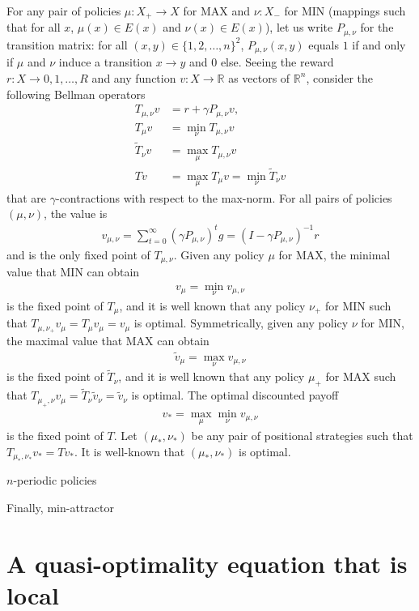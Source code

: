 \documentclass{article}
\def\R{\mathds R}
\begin{document}
For any pair of policies $\mu:X_+ \to X$ for MAX and $\nu:X_-$ for MIN (mappings such that for all $x$, $\mu(x) \in E(x)$ and $\nu(x) \in E(x)$), let us write $P_{\mu,\nu}$ for the transition matrix: for all $(x,y) \in \{1,2,\dots,n\}^2$, $P_{\mu,\nu}(x,y)$ equals $1$ if and only if $\mu$ and $\nu$ induce a transition $x \to y$ and $0$ else. 
Seeing the reward $r:X \to {0,1,\dots,R}$ and any function $v:X \to \R$ as vectors of $\R^n$, consider the following Bellman operators
\begin{align}
  T_{\mu,\nu}v & = r + \gamma P_{\mu,\nu}v, \\
  T_{\mu}v & = \min_{\nu} T_{\mu,\nu}v \\
  \tilde T_{\nu}v & = \max_\mu T_{\mu,\nu}v \\
  T v & =\max_\mu T_{\mu }v = \min_\nu \tilde T_{\nu}v
\end{align}
that are $\gamma$-contractions with respect to the max-norm.
For all pairs of policies $(\mu,\nu)$, the value is
\begin{align}
v_{\mu,\nu} = \sum_{t=0}^\infty (\gamma P_{\mu,\nu})^t g = (I-\gamma P_{\mu,\nu})^{-1}r
\end{align}
and is the only fixed point of $T_{\mu,\nu}$.
Given any policy $\mu$ for MAX, the minimal value that MIN can obtain
\begin{align}
  v_{\mu} = \min_{\nu} v_{\mu,\nu}
\end{align}
is the fixed point of $T_\mu$, and it is well known that any policy $\nu_+$ for MIN such that $T_{\mu,\nu_+}v_\mu = T_\mu v_\mu = v_\mu$ is optimal.
Symmetrically, given any policy $\nu$ for MIN, the maximal value that MAX can obtain
\begin{align}
  \tilde v_{\mu} = \max_{\nu} v_{\mu,\nu}
\end{align}
is the fixed point of $\tilde T_\nu$, and it is well known that any policy $\mu_+$ for MAX such that $T_{\mu_+,\nu}v_\mu = \tilde T_\nu \tilde v_\nu = \tilde v_\nu$ is optimal.
The optimal discounted payoff
\begin{align}
  v_* = \max_{\mu} \min_{\nu} v_{\mu,\nu}
\end{align}
is the fixed point of $T$. Let $(\mu_*,\nu_*)$ be any pair of positional strategies such that $T_{\mu_*,\nu_*}v_*=T v_*$. It is well-known that $(\mu_*,\nu_*)$ is optimal.


$n$-periodic policies


Finally, min-attractor


\section{A quasi-optimality equation that is local}
\end{document}
